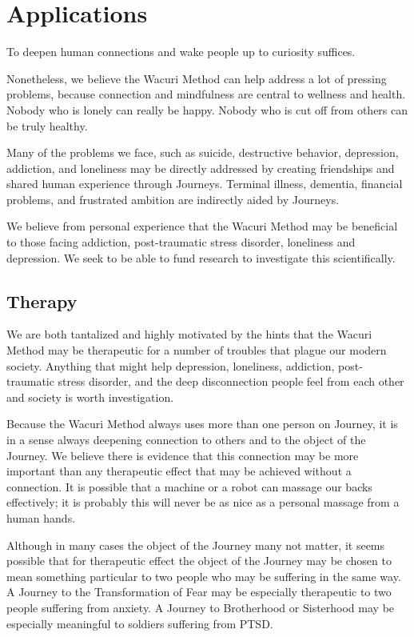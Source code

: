 \documentclass[12pt]{book}
\begin{document}
\chapter{Applications}

To deepen human connections and wake people up
to curiosity suffices.

Nonetheless, we believe the Wacuri Method can help address a lot of
pressing problems, because connection and mindfulness are central to
wellness and health. Nobody who is lonely can really be happy. Nobody
who is cut off from others can be truly healthy.

Many of the problems we face, such as suicide, destructive behavior,
depression, addiction, and loneliness may be directly addressed by
creating friendships and shared human experience through
Journeys. Terminal illness, dementia, financial problems, and
frustrated ambition are indirectly aided by Journeys.

We believe from personal experience that the Wacuri Method may be
beneficial to those facing addiction, post-traumatic stress disorder,
loneliness and depression.  We seek to be able to fund research to
investigate this scientifically.

\section{Therapy}

We are both tantalized and highly motivated by the hints that the
Wacuri Method may be therapeutic for a number of troubles that plague
our modern society. Anything that might help depression, loneliness,
addiction, post-traumatic stress disorder, and the deep disconnection
people feel from each other and society is worth investigation.

Because the Wacuri Method always uses more than one person on Journey,
it is in a sense always deepening connection to others and to the
object of the Journey. We believe there is evidence that this
connection may be more important than any therapeutic effect that may
be achieved without a connection. It is possible that a machine or a
robot can massage our backs effectively; it is probably this will
never be as nice as a personal massage from a human hands.

Although in many cases the object of the Journey many not matter, it
seems possible that for therapeutic effect the object of the Journey
may be chosen to mean something particular to two people who may be
suffering in the same way. A Journey to the Transformation of Fear may
be especially therapeutic to two people suffering from anxiety. A
Journey to Brotherhood or Sisterhood may be especially meaningful to
soldiers suffering from PTSD.
\end{document}
